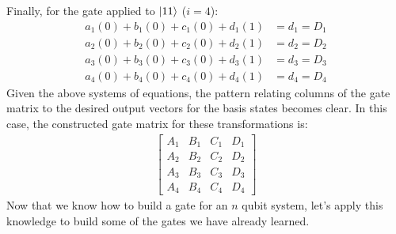 \documentclass{article}
\begin{document}
Finally, for the gate applied to $\ket{11}$ ($i = 4$):
\begin{align*}
	a_{1}(0) + b_{1}(0) + c_{1}(0) + d_{1}(1) &= d_{1} = D_{1} \\
	a_{2}(0) + b_{2}(0) + c_{2}(0) + d_{2}(1) &= d_{2} = D_{2} \\
	a_{3}(0) + b_{3}(0) + c_{3}(0) + d_{3}(1) &= d_{3} = D_{3} \\
	a_{4}(0) + b_{4}(0) + c_{4}(0) + d_{4}(1) &= d_{4} = D_{4}
\end{align*}
Given the above systems of equations, the pattern relating columns of the gate matrix to the desired output vectors for the basis states becomes clear.
In this case, the constructed gate matrix for these transformations is:
\begin{align*}
	\begin{bmatrix}
		A_{1} & B_{1} & C_{1} & D_{1} \\
		A_{2} & B_{2} & C_{2} & D_{2} \\
		A_{3} & B_{3} & C_{3} & D_{3} \\
		A_{4} & B_{4} & C_{4} & D_{4}
	\end{bmatrix}
\end{align*}
Now that we know how to build a gate for an $n$ qubit system, let's apply this knowledge to build some of the gates we have already learned.
\end{document}
